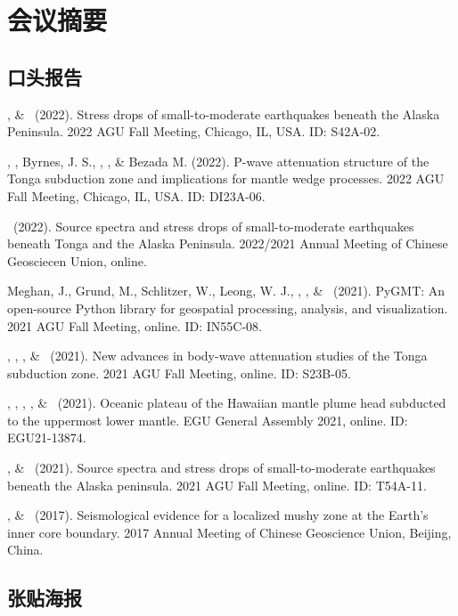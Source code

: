 \section{会议摘要}

\subsection{口头报告}

\begin{etaremune}
\item
    \SWei, \& \Me\ (2022).
    Stress drops of small-to-moderate earthquakes beneath the Alaska Peninsula.
    2022 AGU Fall Meeting, Chicago, IL, USA. ID: S42A-02.
\item
    \YZhang, \SWei, Byrnes, J. S., \Me, \FWang, \& Bezada M. (2022).
    P-wave attenuation structure of the Tonga subduction zone and implications for mantle wedge processes.
    2022 AGU Fall Meeting, Chicago, IL, USA. ID: DI23A-06.
\item
    \Me\ (2022).
    Source spectra and stress drops of small-to-moderate earthquakes beneath Tonga and the Alaska Peninsula.
    2022/2021 Annual Meeting of Chinese Geosciecen Union, online.
\item
    Meghan, J., Grund, M., Schlitzer, W., Leong, W. J., \Me, \JYao, \& \LUieda\ (2021).
    PyGMT: An open-source Python library for geospatial processing, analysis, and visualization.
    2021 AGU Fall Meeting, online. ID: IN55C-08.
\item
    \SWei, \YZhang, \Me, \& \DWiens\ (2021).
    New advances in body-wave attenuation studies of the Tonga subduction zone.
    2021 AGU Fall Meeting, online. ID: S23B-05.
\item
    \SWei, \PShearer, \CLithgowBertelloni, \LStixrude, \& \Me\ (2021).
    Oceanic plateau of the Hawaiian mantle plume head subducted to the uppermost lower mantle.
    EGU General Assembly 2021, online. ID: EGU21-13874.
\item
    \Me, \& \SWei\ (2021).
    Source spectra and stress drops of small-to-moderate earthquakes beneath the Alaska peninsula.
    2021 AGU Fall Meeting, online. ID: T54A-11.
\item
    \Me, \& \LWen\ (2017).
    Seismological evidence for a localized mushy zone at the Earth's inner core boundary.
    2017 Annual Meeting of Chinese Geoscience Union, Beijing, China.
\end{etaremune}

\subsection{张贴海报}

